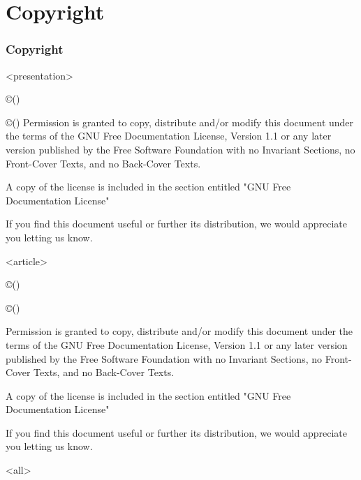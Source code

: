 \section{Copyright}

\begin{frame}[fragile]
\frametitle<presentation>{Copyright}




\mode
<presentation>

\copyright\xspace \configAuthOrigYear\xspace \configAuthOrig\xspace (\configAuthOrigEmail)

\copyright\xspace \configAuthYear\xspace \configAuth\xspace (\configAuthEmail)
\linebreak
\linebreak
Permission is granted to copy, distribute and/or modify this document 
under the terms of the GNU Free Documentation License, Version 1.1
or any later version published by the Free Software Foundation
with no Invariant Sections, no Front-Cover Texts, and no Back-Cover Texts.

A copy of the license is included in the section entitled "GNU Free Documentation License"

If you find this document useful or further its distribution, we would
appreciate you letting us know.


\mode
<article>
\begin{flushleft}
\copyright\xspace \configAuthOrigYear\xspace \configAuthOrig\xspace (\configAuthOrigEmail)

\copyright\xspace \configAuthYear\xspace \configAuth\xspace (\configAuthEmail) 

\end{flushleft}
Permission is granted to copy, distribute and/or modify this document 
under the terms of the GNU Free Documentation License, Version 1.1
or any later version published by the Free Software Foundation
with no Invariant Sections, no Front-Cover Texts, and no Back-Cover Texts.

A copy of the license is included in the section entitled "GNU Free Documentation License"

If you find this document useful or further its distribution, we would
appreciate you letting us know.


\mode
<all>

\end{frame}
\newpage


